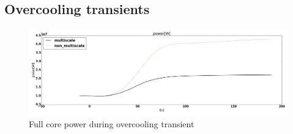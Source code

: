 \documentclass{elsarticle}
\begin{document}






\newpage
\subsection{Overcooling transients}

\begin{figure}[h]
    \centering
        \includegraphics[width=1\linewidth]{./images/diffusion/tmsr/OC/compare_multiscale/power.png}
        \caption{Full core power during overcooling transient}
        \label{fig:OC_power}
\end{figure}
\end{document}
